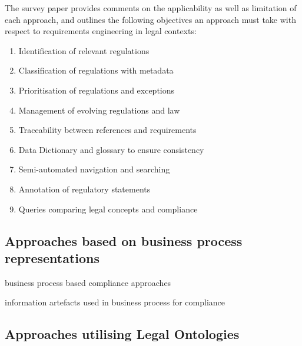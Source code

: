 The survey paper provides comments on the applicability as well as limitation of each approach, and  outlines the following objectives an approach must take with respect to requirements engineering in legal contexts:
\begin{enumerate}
    \item Identification of relevant regulations
    \item Classification of regulations with metadata
    \item Prioritisation of regulations and exceptions
    \item Management of evolving regulations and law
    \item Traceability between references and requirements
    \item Data Dictionary and glossary to ensure consistency
    \item Semi-automated navigation and searching
    \item Annotation of regulatory statements
    \item Queries comparing legal concepts and compliance
\end{enumerate}{}

\subsection{Approaches based on business process representations}

\cite{fellmann_state---art_2014}
business process based compliance approaches

\cite{benyoucef_information_2015}
information artefacts used in business process for compliance

\subsection{Approaches utilising Legal Ontologies}

